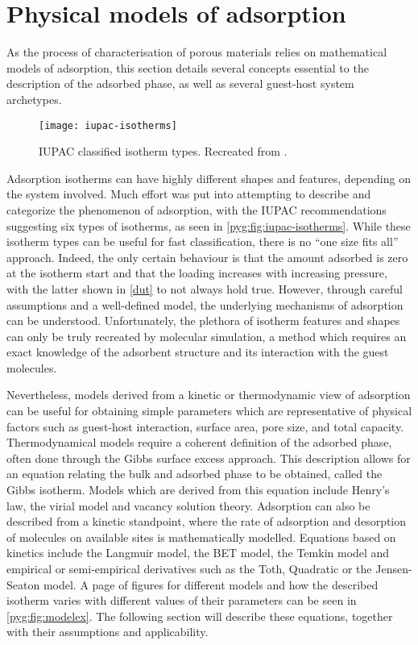 
\section{Physical models of adsorption}%
\label{pyg:models}

As the process of characterisation of porous materials
relies on mathematical models of adsorption, this section 
details several concepts essential to the description of the 
adsorbed phase, as well as several guest-host system archetypes.

\begin{figure}[htb]
	\centering
	\texttt{[image: iupac-isotherms]}
	\caption{
		\gls{IUPAC} classified isotherm types. 
		Recreated from \citet{thommesPhysisorptionGasesSpecial2015}.
	}\label{pyg:fig:iupac-isotherms}
\end{figure}

Adsorption isotherms can have highly different shapes and features,
depending on the system involved. 
Much effort was put into attempting to describe and categorize
the phenomenon of adsorption, with the \gls{IUPAC} recommendations suggesting
six types of isotherms, as seen in \autoref{pyg:fig:iupac-isotherms}. 
While these isotherm types can be useful for fast classification, 
there is no ``one size fits all'' approach. Indeed, the only 
certain behaviour is that the amount adsorbed is zero at
the isotherm start and that the loading increases with increasing 
pressure, with the latter shown in \autoref{dut} to not always 
hold true. However, through careful assumptions and a well-defined
model, the underlying mechanisms of adsorption can be understood.
Unfortunately, the plethora of isotherm features and shapes can only
be truly recreated by molecular simulation, a method which requires an
exact knowledge of the adsorbent structure and its interaction
with the guest molecules.

Nevertheless, models derived from a kinetic or thermodynamic
view of adsorption can be useful for obtaining simple parameters
which are representative of physical factors such as
guest-host interaction, surface area, pore size,
and total capacity. Thermodynamical models require a coherent
definition of the adsorbed phase, often done through the 
Gibbs surface excess approach. This description allows for an equation 
relating the bulk and adsorbed phase to be obtained, called
the Gibbs isotherm. Models which are derived from this equation include
Henry's law, the virial model and vacancy solution theory.
Adsorption can also be described from a kinetic standpoint, where
the rate of adsorption and desorption of molecules on
available sites is mathematically modelled. Equations based
on kinetics include the Langmuir model, the \gls{BET} model,
the Temkin model and empirical or semi-empirical derivatives
such as the Toth, Quadratic or the Jensen-Seaton model.
A page of figures for different models and how the
described isotherm varies with different values of
their parameters can be seen in
\autoref{pyg:fig:modelex}. The following section will describe
these equations, together with their assumptions and
applicability.

